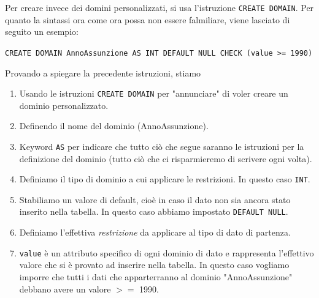 \documentclass[12pt]{report}
\begin{document}
	Per creare invece dei domini personalizzati, si usa l'istruzione \texttt{CREATE DOMAIN}. Per quanto la sintassi ora come ora possa non essere falmiliare, viene lasciato di seguito un esempio:
	\begin{center}
		\texttt{CREATE DOMAIN AnnoAssunzione AS INT DEFAULT NULL CHECK (value >= 1990)}
	\end{center}
	Provando a spiegare la precedente istruzioni, stiamo
	\begin{enumerate}
		\item Usando le istruzioni \texttt{CREATE DOMAIN} per "annunciare" di voler creare un dominio personalizzato.
		
		\item Definendo il nome del dominio (AnnoAssunzione).
		
		\item Keyword \texttt{AS} per indicare che tutto ciò che segue saranno le istruzioni per la definizione del dominio (tutto ciò che ci risparmieremo di scrivere ogni volta).
		
		\item Definiamo il tipo di dominio a cui applicare le restrizioni. In questo caso \texttt{INT}.
		
		\item Stabiliamo un valore di default, cioè in caso il dato non sia ancora stato inserito nella tabella. In questo caso abbiamo impostato \texttt{DEFAULT NULL}.
		
		\item Definiamo l'effettiva \textit{restrizione} da applicare al tipo di dato di partenza.
		
		\item \texttt{value} è un attributo specifico di ogni dominio di dato e rappresenta l'effettivo valore che si è provato ad inserire nella tabella. In questo caso vogliamo imporre che tutti i dati che apparterranno al dominio "AnnoAssunzione" debbano avere un valore $>=$ 1990.
	\end{enumerate}
	
\end{document}
